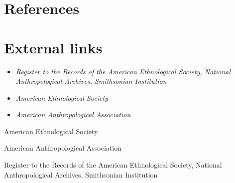 \section{References}\label{references}

\section{External links}\label{external-links}

\begin{itemize}
\item
  \emph{Register to the Records of the American Ethnological Society,
  National Anthropological Archives, Smithsonian Institution}
\item
  \emph{American Ethnological Society}
\item
  \emph{American Anthropological Association}
\end{itemize}

American Ethnological Society

American Anthropological Association

Register to the Records of the American Ethnological Society, National
Anthropological Archives, Smithsonian Institution
